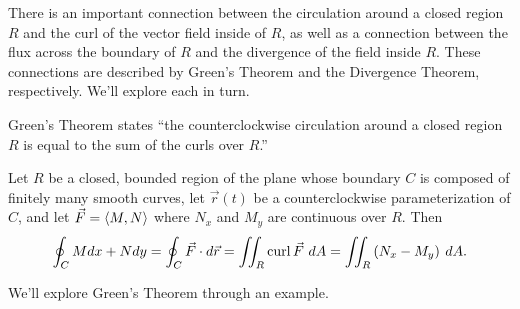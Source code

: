 There is an important connection between the circulation around a closed region $R$ and the curl of the vector field inside of $R$, as well as a connection between the flux across the boundary of $R$ and the divergence of the field inside $R$. These connections are described by Green's Theorem and the Divergence Theorem, respectively. We'll explore each in turn.

Green's Theorem states ``the counterclockwise circulation around a closed region $R$ is equal to the sum of the curls over $R$.''

{Let $R$ be a closed, bounded region of the plane whose boundary $C$ is composed of finitely many smooth curves, let $\vec r(t)$ be a counterclockwise parameterization of $C$, and let $\vec F =\left\langle M,N\right\rangle$ where $N_x$ and $M_y$ are continuous over $R$. Then
$$\oint_C M dx +N dy = \oint_C \vec F\cdot d\vec r = \iint_R\operatorname{curl} \vec F\ dA = \iint_R \left( N_x - M_y \right) \: dA.$$
}

We'll explore Green's Theorem through an example. \\

